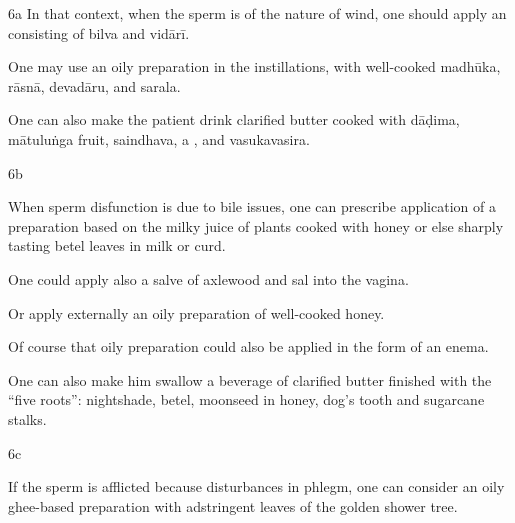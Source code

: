 \begin{translation}
\begin{sloka}
 \end{sloka}
 
 \item[6a] In that context, when the sperm is of the nature of wind, one
should apply an 
consisting of \gls{bilva} and \gls{vidārī}.
 
 
  One may use an oily preparation in the instillations, with well-cooked 
  \gls{madhūka},
  \gls{rāsnā},
  \gls{devadāru},
  and \gls{sarala}.
 
 
 
  One can also make the patient drink clarified butter cooked with \gls{dāḍima}, 
  \gls{mātuluṅga} fruit, \gls{saindhava}, a , and 
  \gls{vasukavasira}.
 
 \begin{tt}
 \raggedright
 
 \item[6b]
 
   When sperm disfunction is due to bile issues, one can prescribe application of 
   a preparation based on the milky juice of plants cooked with honey or else 
   sharply tasting betel leaves in milk or curd.
 
 
  One could apply also a salve of axlewood and sal into the vagina.
 
 
  Or apply externally an oily preparation of well-cooked honey.
 
 
  Of course that oily preparation could also be applied in the form of an enema.
 
 
  One can also make him swallow a beverage of clarified butter finished with the 
  “five roots”: nightshade, betel, moonseed in honey, dog’s tooth and sugarcane 
  stalks. 
 
 \item[6c]
 
  If the sperm is afflicted because disturbances in phlegm, one can consider an 
  oily ghee-based preparation with adstringent leaves of the golden shower tree.
 

\end{tt}
\end{translation}
